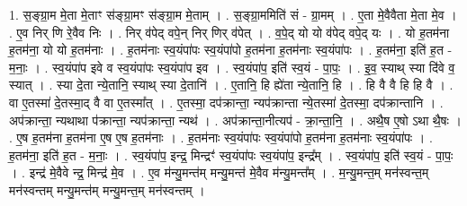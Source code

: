 \documentclass[17pt]{extarticle}
\begin{document}
1. स॒ङ्ग्रा॒म मे॒ता मे॒ताꣳ स॑ङ्ग्रा॒मꣳ स॑ङ्ग्रा॒म मे॒ताम् । . स॒ङ्ग्रा॒ममिति॑ सं - ग्रा॒मम् । . ए॒ता मे॒वैवैता मे॒ता मे॒व । . ए॒व निर् णि रे॒वैव निः । . निर् व॑पेद् वपे॒न् निर् णिर् व॑पेत् । . व॒पे॒द् यो यो व॑पेद् वपे॒द् यः । . यो ह॒तम॑ना ह॒तम॑ना॒ यो यो ह॒तम॑नाः । . ह॒तम॑नाः स्व॒यंपा॑पः स्व॒यंपा॑पो ह॒तम॑ना ह॒तम॑नाः स्व॒यंपा॑पः । . ह॒तम॑ना॒ इति॑ ह॒त - म॒नाः॒ । . स्व॒यंपा॑प इवे व स्व॒यंपा॑पः स्व॒यंपा॑प इव । . स्व॒यंपा॑प॒ इति॑ स्व॒यं - पा॒पः॒ । . इ॒व॒ स्याथ् स्या दि॑वे व॒ स्यात् । . स्या दे॒ता न्ये॒तानि॒ स्याथ् स्या दे॒तानि॑ । . ए॒तानि॒ हि ह्ये॑ता न्ये॒तानि॒ हि । . हि वै वै हि हि वै । . वा ए॒तस्मा॑ दे॒तस्मा॒द् वै वा ए॒तस्मा᳚त् । . ए॒तस्मा॒ दप॑क्रान्ता॒ न्यप॑क्रान्ता न्ये॒तस्मा॑ दे॒तस्मा॒ दप॑क्रान्तानि । . अप॑क्रान्ता॒ न्यथाथा प॑क्रान्ता॒ न्यप॑क्रान्ता॒ न्यथ॑ । . अप॑क्रान्ता॒नीत्यप॑ - क्रा॒न्ता॒नि॒ । . अथै॒ष ए॒षो ऽथा थै॒षः । . ए॒ष ह॒तम॑ना ह॒तम॑ना ए॒ष ए॒ष ह॒तम॑नाः । . ह॒तम॑नाः स्व॒यंपा॑पः स्व॒यंपा॑पो ह॒तम॑ना ह॒तम॑नाः स्व॒यंपा॑पः । . ह॒तम॑ना॒ इति॑ ह॒त - म॒नाः॒ । . स्व॒यंपा॑प॒ इन्द्र॒ मिन्द्रꣳ॑ स्व॒यंपा॑पः स्व॒यंपा॑प॒ इन्द्र᳚म् । . स्व॒यंपा॑प॒ इति॑ स्व॒यं - पा॒पः॒ । . इन्द्र॑ मे॒वैवे न्द्र॒ मिन्द्र॑ मे॒व । . ए॒व म॑न्यु॒मन्त॑म् मन्यु॒मन्त॑ मे॒वैव म॑न्यु॒मन्त᳚म् । . म॒न्यु॒मन्त॒म् मन॑स्वन्त॒म् मन॑स्वन्तम् मन्यु॒मन्त॑म् मन्यु॒मन्त॒म् मन॑स्वन्तम् । \newline
\end{document}
